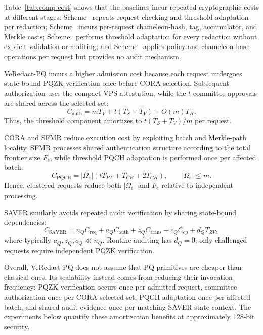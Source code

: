 \documentclass[lettersize,journal]{IEEEtran}
\begin{document}
Table~\ref{tab:comp-cost} shows that the baselines incur repeated
cryptographic costs at different stages. Scheme~\cite{ref1} repeats
request checking and threshold adaptation per redaction;
Scheme~\cite{ref13} incurs per-request chameleon-hash, tag,
accumulator, and Merkle costs; Scheme~\cite{ref27} performs threshold
adaptation for every redaction without explicit validation or auditing;
and Scheme~\cite{ref34} applies policy and chameleon-hash operations
per request but provides no audit mechanism.

VeRedact-PQ incurs a higher admission cost because each request
undergoes state-bound PQZK verification once before CORA selection.
Subsequent authorization uses the compact VPS attestation, while the
$t$ committee approvals are shared across the selected set:
\begin{equation}
C_{\mathrm{auth}}
=
mT_V+t(T_S+T_V)+O(m)T_H.
\end{equation}
Thus, the threshold component amortizes to
$t(T_S+T_V)/m$ per request.

CORA and SFMR reduce execution cost by exploiting batch and Merkle-path
locality. SFMR processes shared authentication structure according to
the total frontier size $F_e$, while threshold PQCH adaptation is
performed once per affected batch:
\begin{equation}
C_{\mathrm{PQCH}}
=
|\Omega_e|(tT_{PA}+T_{CB}+2T_{CH}),
\qquad |\Omega_e|\leq m.
\end{equation}
Hence, clustered requests reduce both $|\Omega_e|$ and $F_e$ relative
to independent processing.

SAVER similarly avoids repeated audit verification by sharing
state-bound dependencies:
\begin{equation}
C_{\mathrm{SAVER}}
=
n_QC_{\mathrm{req}}
+a_QC_{\mathrm{auth}}
+z_QC_{\mathrm{trans}}
+c_QC_{\mathrm{cp}}
+d_QT_{ZV},
\label{eq:saver_cost}
\end{equation}
where typically $a_Q,z_Q,c_Q\ll n_Q$. Routine auditing has $d_Q=0$;
only challenged requests require independent PQZK verification.

Overall, VeRedact-PQ does not assume that PQ primitives are cheaper
than classical ones. Its scalability instead comes from reducing their
invocation frequency: PQZK verification occurs once per admitted
request, committee authorization once per CORA-selected set, PQCH
adaptation once per affected batch, and shared audit evidence once per
matching SAVER state context. The experiments below quantify these
amortization benefits at approximately 128-bit security.
\end{document}
